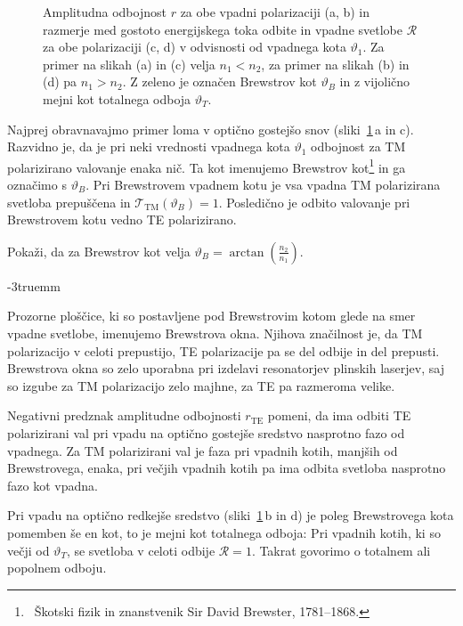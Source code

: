 \begin{figure}[ht]
\centering
  \def\svgwidth{128truemm} 
  
\caption{Amplitudna odbojnost $r$ za obe vpadni polarizaciji (a, b) in razmerje med 
gostoto energijskega toka odbite in vpadne svetlobe $\mathcal{R}$ za obe polarizaciji (c, d)
v odvisnosti od vpadnega kota $\vartheta_1$. Za primer na slikah (a) in (c) velja $n_1<n_2$, za primer na 
slikah (b) in (d) pa $n_1>n_2$. Z zeleno je označen Brewstrov kot $\vartheta_B$ in
z vijolično mejni kot totalnega odboja $\vartheta_T$.}
\label{fig:Brewster}
\end{figure}
Najprej obravnavajmo primer loma v optično gostejšo snov 
(sliki~\ref{fig:Brewster}\,a in c). Razvidno je, 
da je pri neki vrednosti vpadnega kota $\vartheta_1$ odbojnost za 
TM polarizirano valovanje enaka nič. Ta kot imenujemo Brewstrov 
kot\footnote{~Škotski fizik in znanstvenik Sir David Brewster, 1781--1868.} in ga označimo s $\vartheta_B$. 
Pri Brewstrovem vpadnem kotu je vsa vpadna TM polarizirana svetloba prepuščena
in $\mathcal{T}_\mathrm{TM}(\vartheta_B)=1$. Posledično je odbito valovanje pri Brewstrovem
kotu vedno TE polarizirano. 
\begin{naloga}
Pokaži, da za Brewstrov kot velja
$\vartheta_{B}=\arctan\left(\frac{n_2}{n_1}\right)\!\!.$
\label{eq:Brew}
\end{naloga}
\vglue-3truemm
\begin{remark}
Prozorne ploščice, ki so postavljene pod Brewstrovim kotom glede na smer vpadne svetlobe, 
imenujemo Brewstrova okna. Njihova značilnost je,
da TM polarizacijo v celoti prepustijo, TE polarizacije pa se del odbije in  
del prepusti. Brewstrova okna so zelo uporabna pri izdelavi resonatorjev 
plinskih laserjev, saj so izgube za TM polarizacijo zelo majhne, 
za TE pa razmeroma velike.  
\end{remark}

Negativni predznak amplitudne odbojnosti $r_{\mathrm{TE}}$ pomeni, da ima odbiti TE 
polarizirani val pri vpadu na optično gostejše sredstvo nasprotno 
fazo od vpadnega. Za TM polarizirani val je faza pri vpadnih kotih, manjših od Brewstrovega, 
enaka, pri večjih vpadnih kotih pa ima odbita svetloba nasprotno fazo kot vpadna. 

Pri vpadu na optično redkejše sredstvo 
(sliki~\ref{fig:Brewster}\,b in d) je poleg Brewstrovega kota
pomemben še en kot, to je mejni kot totalnega odboja: 
Pri vpadnih kotih, ki so večji od $\vartheta_T$, se svetloba v celoti odbije 
$\mathcal{R}=1$. Takrat govorimo
o totalnem ali popolnem odboju.

